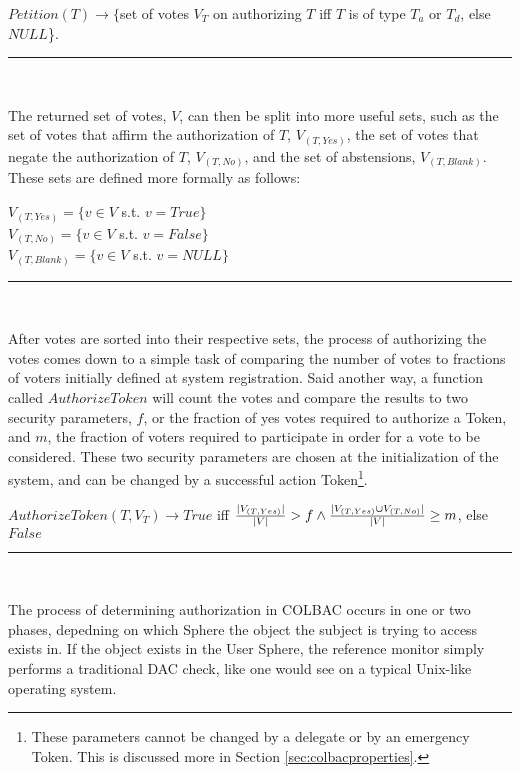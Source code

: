 \begin{definition}\label{def:petition}
$Petition(T) \rightarrow \{$set of votes $V_{T}$ on authorizing $T$ iff $T$ is
of type $T_{a}$ or $T_{d}$, else $NULL$\}.\\
\hrule \mbox{}\\
\end{definition}

\noindent The returned set of votes, $V$, can then be split into more useful
sets, such as the set of votes that affirm the authorization of $T$,
$V_{(T, Yes)}$, the set of votes that negate the authorization of $T$,
$V_{(T, No)}$, and the set of abstensions, $V_{(T, Blank)}$. These sets are
defined more formally as follows:

\begin{definition}\label{def:votes}
$V_{(T, Yes)} = \{v \in V$ s.t. $v = True\}$\\
$V_{(T, No)} = \{v \in V$ s.t. $v = False\}$\\
$V_{(T, Blank)} = \{v \in V$ s.t. $v = NULL\}$\\
\hrule\mbox{}\\
\end{definition}

\noindent After votes are sorted into their respective sets, the process of
authorizing the votes comes down to a simple task of comparing the number of
votes to fractions of voters initially defined at system registration. Said
another way, a function called $AuthorizeToken$ will count the votes and compare
the results to two security parameters, $f$, or the fraction of yes votes
required to authorize a Token, and $m$, the fraction of voters required to
participate in order for a vote to be considered. These two security parameters
are chosen at the initialization of the system, and can be changed by a
successful action Token\footnote{These parameters cannot be changed by a
delegate or by an emergency Token. This is discussed more in Section
\ref{sec:colbacproperties}.}.
\begin{definition}
$AuthorizeToken(T,V_{T}) \rightarrow True$ iff $\frac{|V_{(T, Yes)}|}{|V|} > f
\wedge \\ \frac{|V_{(T,Yes)} \cup V_{(T, No)}|}{|V|} \ge m$, else $False$\\
\hrule\mbox{}\\
\end{definition}

The process of determining authorization in COLBAC occurs in one or two phases,
depedning on which Sphere the object the subject is trying to access exists in.
If the object exists in the User Sphere, the reference monitor simply performs a
traditional DAC check, like one would see on a typical Unix-like operating
system.

